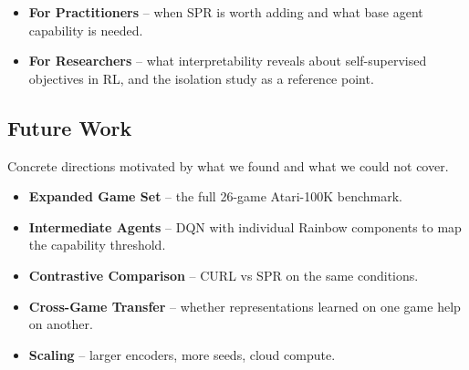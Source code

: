 \documentclass[11pt]{article}
\begin{document}
\begin{itemize}
\item \textbf{For Practitioners} -- when SPR is worth adding and
  what base agent capability is needed.
\item \textbf{For Researchers} -- what interpretability reveals
  about self-supervised objectives in RL, and the isolation study
  as a reference point.
\end{itemize}

\subsection{Future Work}

\noindent Concrete directions motivated by what we found and what
we could not cover.

\begin{itemize}
\item \textbf{Expanded Game Set} -- the full 26-game Atari-100K
  benchmark.
\item \textbf{Intermediate Agents} -- DQN with individual Rainbow
  components to map the capability threshold.
\item \textbf{Contrastive Comparison} -- CURL vs SPR on the same
  conditions.
\item \textbf{Cross-Game Transfer} -- whether representations
  learned on one game help on another.
\item \textbf{Scaling} -- larger encoders, more seeds, cloud
  compute.
\end{itemize}
\end{document}
